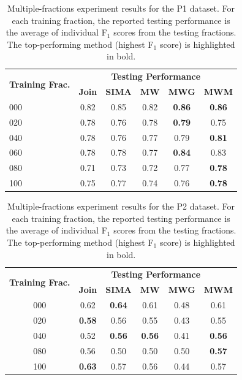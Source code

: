 \begin{table}[!htbp]
\noindent \begin{centering}
\begin{tabular}{|l|c|c|c|c|c|}
\hline 
\multirow{2}{*}{\textbf{Training Frac.}} & \multicolumn{5}{c|}{\textbf{Testing Performance}}\tabularnewline
\cline{2-6} 
 & \textbf{Join} & \textbf{SIMA} & \textbf{MW} & \textbf{MWG} & \textbf{MWM}\tabularnewline
\hline 
\hline 
\multirow{1}{*}{{000}} & {0.82} & {0.85} & {0.82} & \textbf{0.86} & \textbf{0.86}\tabularnewline
\hline 
\multirow{1}{*}{{020}} & {0.78} & {0.76} & {0.78} & \textbf{0.79} & {0.75}\tabularnewline
\hline 
\multirow{1}{*}{{040}} & {0.78} & {0.76} & {0.77} & {0.79} & \textbf{0.81}\tabularnewline
\hline 
\multirow{1}{*}{{060}} & {0.78} & {0.78} & {0.77} & \textbf{0.84} & {0.83}\tabularnewline
\hline 
\multirow{1}{*}{{080}} & {0.71} & {0.73} & {0.72} & {0.77} & \textbf{0.78}\tabularnewline
\hline 
\multirow{1}{*}{{100}} & {0.75} & {0.77} & {0.74} & {0.76} & \textbf{0.78}\tabularnewline
\hline 
\end{tabular}
\par\end{centering}
\caption[Multiple-fractions experiment results for the
P1 dataset.]{\label{tab:within-P1}Multiple-fractions experiment results for the
P1 dataset. For each training fraction, the reported testing performance is the average of individual F$_1$ scores from the testing fractions. The top-performing method (highest F$_1$ score) is highlighted in bold.}
\end{table}

\begin{table}[!htbp]
\noindent \begin{centering}
\begin{tabular}{|c|c|c|c|c|c|}
\hline 
\multirow{2}{*}{\textbf{Training Frac.}} & \multicolumn{5}{c|}{\textbf{Testing Performance}}\tabularnewline
\cline{2-6} 
 & \textbf{Join} & \textbf{SIMA} & \textbf{MW} & \textbf{MWG} & \textbf{MWM}\tabularnewline
\hline 
\hline 
\multirow{1}{*}{{000}} & {0.62} & \textbf{0.64} & {0.61} & {0.48} & {0.61}\tabularnewline
\hline 
\multirow{1}{*}{{020}} & \textbf{0.58} & {0.56} & {0.55} & {0.43} & {0.55}\tabularnewline
\hline 
\multirow{1}{*}{{040}} & {0.52} & \textbf{0.56} & \textbf{0.56} & {0.41} & \textbf{0.56}\tabularnewline
\hline 
\multirow{1}{*}{{080}} & {0.56} & {0.50} & {0.50} & {0.50} & \textbf{0.57}\tabularnewline
\hline 
\multirow{1}{*}{{100}} & \textbf{0.63} & {0.57} & {0.56} & {0.44} & {0.57}\tabularnewline
\hline 
\end{tabular}
\par\end{centering}
\caption[Multiple-fractions experiment results for the
P2 dataset.]{\label{tab:within-P2}Multiple-fractions experiment results for the
P2 dataset. For each training fraction, the reported testing performance is the average of individual F$_1$ scores from the testing fractions. The top-performing method (highest F$_1$ score) is highlighted in bold.}
\end{table}

